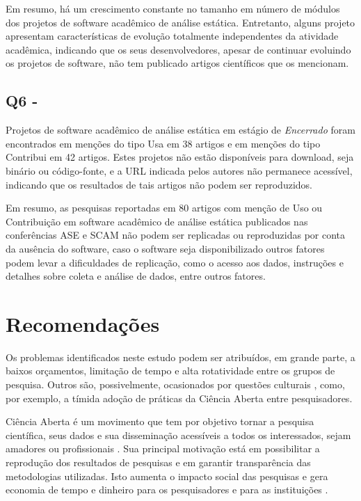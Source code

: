 Em resumo, há um crescimento constante no tamanho em número de módulos dos
projetos de software acadêmico de análise estática.
Entretanto, alguns projeto apresentam características de evolução 
totalmente independentes da atividade acadêmica, 
indicando que os seus desenvolvedores, 
apesar de continuar evoluindo os projetos de software,
não tem publicado artigos científicos que os mencionam.

\subsection{Q6 - \QuestaoSeis}

Projetos de software acadêmico de análise estática em estágio de {\it Encerrado} 
foram encontrados em menções do tipo Usa em 38 artigos 
e em menções do tipo Contribui em 42 artigos.
Estes projetos não estão disponíveis para download, seja binário ou código-fonte, 
e a URL indicada pelos autores não permanece acessível, 
indicando que os resultados de tais artigos não podem ser reproduzidos.

Em resumo, as pesquisas reportadas em 80 artigos com menção de Uso ou Contribuição em 
software acadêmico de análise estática publicados nas conferências ASE e SCAM 
não podem ser replicadas ou reproduzidas por conta da ausência do software,
caso o software seja disponibilizado outros fatores podem levar a dificuldades
de replicação, como o acesso aos dados, instruções e detalhes sobre coleta e
análise de dados, entre outros fatores.

\section{Recomendações}
\label{sec:recomendacoes}

Os problemas identificados neste estudo podem ser atribuídos, em grande parte,
a baixos orçamentos, limitação de tempo e alta rotatividade entre os
grupos de pesquisa. Outros são, possivelmente, ocasionados por questões
culturais \cite{niemeyer2017open}, como, por exemplo, a tímida adoção de
práticas da Ciência Aberta entre pesquisadores.

Ciência Aberta é um movimento que tem por objetivo tornar a pesquisa
científica, seus dados e sua disseminação acessíveis a todos os interessados,
sejam amadores ou profissionais \cite{WikipediaOpenScience}. Sua principal
motivação está em possibilitar a reprodução dos resultados de pesquisas e em
garantir transparência das metodologias utilizadas. Isto aumenta o impacto
social das pesquisas e gera economia de tempo e dinheiro para os pesquisadores
e para as instituições \cite{nesta2010open}.

